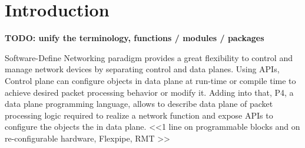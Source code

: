 \documentclass[10pt,sigconf,letterpaper,anonymous]{acmart}
\begin{document}



\maketitle

\section{Introduction}

\textbf{TODO: unify the terminology, functions / modules / packages}


Software-Define Networking paradigm provides a great flexibility to control and manage network devices by separating control and data planes.
Using APIs, Control plane can configure objects in data plane at run-time or compile time to achieve desired packet processing behavior or modify it.
Adding into that, P4, a data plane programming language, allows to describe data plane of packet processing logic required to realize a network function and expose APIs to configure the objects the in data plane.
<<1 line on programmable blocks and on re-configurable hardware, Flexpipe, RMT >>
\end{document}
